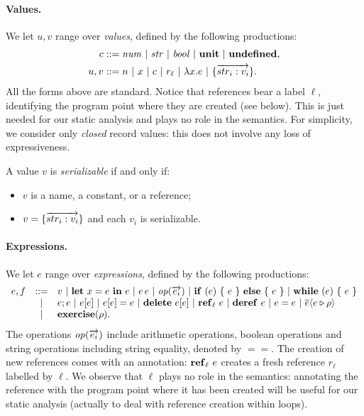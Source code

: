 \paragraph*{Values.} 
We let $u,v$ range over \emph{values}, defined by the following productions:
\begin{align*}
c & ::= \mathit{num} ~|~ \mathit{str} ~|~ \mathit{bool} ~|~ \mathbf{unit} ~|~ \mathbf{undefined}, \\
u,v &::= n ~|~ x ~|~ c ~|~ r_{\ell} ~|~ \lambda x.e ~|~ \{\overrightarrow{str_i:v_i}\}.
\end{align*}
All the forms above are standard. Notice that references bear a label $\ell$, identifying the program point where they are created (see below). This is just needed for our static analysis and plays no role in the semantics. For simplicity, we consider only \emph{closed} record values: this does not involve any loss of expressiveness.

\begin{definition}
\label{def:serializable}
A value $v$ is \emph{serializable} if and only if:
\begin{itemize}
\item $v$ is a name, a constant, or a reference;
\item $v = \{\overrightarrow{str_i:v_i}\}$ and each $v_i$ is serializable.
\end{itemize}
\end{definition}

\paragraph*{Expressions.} 
We let $e$ range over \emph{expressions}, defined by the following productions:
\[
\begin{array}{lcl}
e,f & ::= & v ~|~ \mathbf{let}\ x = e\ \mathbf{in}\ e ~|~ e\, e ~|~ \mathit{op}(\overrightarrow{e_i}) ~|~ \mathbf{if}\ (e)\ \{\ e\ \}\ \mathbf{else}\ \{\ e\ \} ~|~ \mathbf{while}\ (e)\ \{\ e\ \} \\
& | & e;e ~|~ e[e] ~|~ e[e] = e ~|~ \mathbf{delete}\ e[e] ~|~ \mathbf{ref}_{\ell}\ e ~|~ \mathbf{deref}\ e ~|~ e = e ~|~ \overline{e} \langle e \triangleright \rho \rangle \\
& | & \mathbf{exercise}(\rho).
\end{array}
\]
The operations $\mathit{op}(\overrightarrow{e_i})$ include arithmetic operations, boolean
operations and string operations including string equality, denoted by
$==$. The creation of new references comes with an annotation:
$\mathbf{ref}_{\ell}\ e$ creates a fresh reference $r_\ell$ labelled by $\ell$.
We observe that $\ell$ plays no role in the semantics: annotating the reference
with the program point where it has been created will be useful for our
static analysis (actually to deal with reference creation within
loops).

